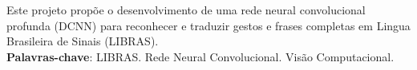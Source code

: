 
\begin{resumo}[RESUMO]

    \begin{SingleSpacing}

        Este projeto prop\~oe o desenvolvimento de uma rede neural convolucional profunda (DCNN) para reconhecer e traduzir gestos e frases completas em Lingua Brasileira de Sinais (LIBRAS). \\
        
        \textbf{Palavras-chave}: LIBRAS. Rede Neural Convolucional. Vis\~ao Computacional.
    
    \end{SingleSpacing}
    
\end{resumo}
